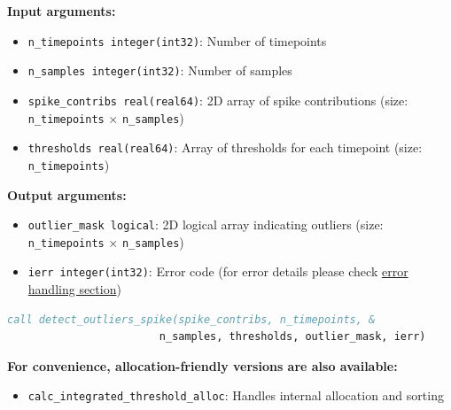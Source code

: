\documentclass[11pt]{article}
\begin{document}
\begin{enumerate}
\begin{enumerate}
\begin{enumerate}
	      	      	      \textbf{Input arguments:}
	      	      	      \begin{itemize}
	      	      	      	\item \texttt{n\_timepoints integer(int32)}: Number of timepoints
	      	      	      	      
	      	      	      	\item \texttt{n\_samples integer(int32)}: Number of samples
	      	      	      	      
	      	      	      	\item \texttt{spike\_contribs real(real64)}: 2D array of spike contributions
	      	      	      	      (size: \texttt{n\_timepoints} × \texttt{n\_samples})
	      	      	      	      
	      	      	      	\item \texttt{thresholds real(real64)}: Array of thresholds for each
	      	      	      	      timepoint (size: \texttt{n\_timepoints})
	      	      	      \end{itemize}
	      	      	      \textbf{Output arguments:}
	      	      	      \begin{itemize}
	      	      	      	\item \texttt{outlier\_mask logical}: 2D logical array indicating
	      	      	      	      outliers (size: \texttt{n\_timepoints} × \texttt{n\_samples})
	      	      	      	      
	      	      	      	\item \texttt{ierr integer(int32)}: Error code (for error
	      	      	      	      details please check
	      	      	      	      \hyperref[sec:error-handling]{error handling section})
	      	      	      \end{itemize}
	      	      	      \begin{lstlisting}[language=Fortran, caption={Spike Outlier Detection}]
call detect_outliers_spike(spike_contribs, n_timepoints, &
                        n_samples, thresholds, outlier_mask, ierr)
	      	      	      \end{lstlisting}
	      	      \end{enumerate}
	      	      
	      	      \textbf{For convenience, allocation-friendly versions are also available:}
	      	      \begin{itemize}
	      	      	\item \texttt{calc\_integrated\_threshold\_alloc}: Handles internal allocation
	      	      	      and sorting
	      	      	      

\end{itemize}
\end{enumerate}
\end{enumerate}
\end{document}
